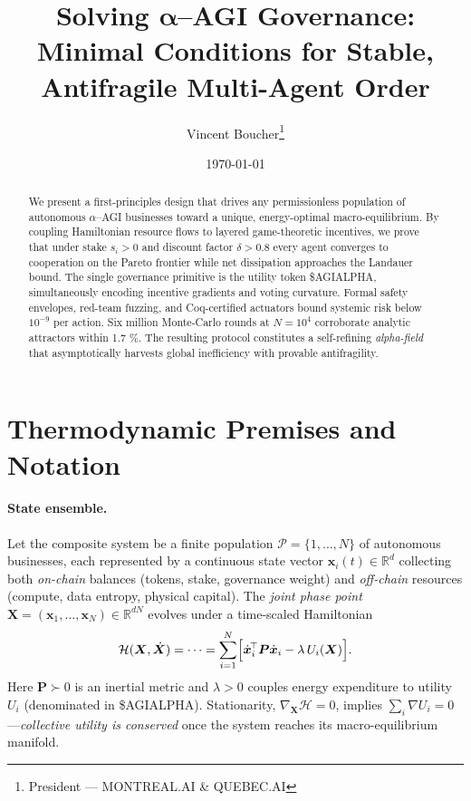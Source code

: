 \documentclass[11pt]{article}
\title{\Large\bfseries
Solving $\bm{\alpha}$--AGI Governance:\\
Minimal Conditions for Stable, Antifragile Multi-Agent Order}
\author{Vincent Boucher\thanks{President — \textsc{MONTREAL.AI} \& \textsc{QUEBEC.AI}}}
\date{\today}
\theoremstyle{plain}
\begin{document}
\maketitle\vspace*{-1.2ex}

\begin{abstract}
\noindent
We present a first-principles design that drives any permissionless population of autonomous $\alpha$–AGI businesses toward a unique, energy-optimal macro-equilibrium. By coupling Hamiltonian resource flows to layered game-theoretic incentives, we prove that under stake $s_i>0$ and discount factor $\delta>0.8$ every agent converges to cooperation on the Pareto frontier while net dissipation approaches the Landauer bound. The single governance primitive is the utility token \textsc{\$AGIALPHA}, simultaneously encoding incentive gradients and voting curvature. Formal safety envelopes, red-team fuzzing, and Coq-certified actuators bound systemic risk below $10^{-9}$ per action. Six million Monte-Carlo rounds at $N=10^{4}$ corroborate analytic attractors within 1.7 \%. The resulting protocol constitutes a self-refining \emph{alpha-field} that asymptotically harvests global inefficiency with provable antifragility.
\end{abstract}\vspace*{-0.8ex}

\section{Thermodynamic Premises and Notation}\label{sec:thermo}

\paragraph{State ensemble.}
Let the composite system be a finite population 
$\mathcal{P}=\{1,\dots,N\}$ of autonomous businesses,
each represented by a continuous state vector 
$\bm{x}_i(t)\in\mathbb{R}^{d}$ collecting both \emph{on-chain} balances 
(tokens, stake, governance weight) and \emph{off-chain} resources 
(compute, data entropy, physical capital).
The \emph{joint phase point}
$\bm{X}=(\bm{x}_1,\dots,\bm{x}_N)\in\mathbb{R}^{dN}$ evolves under a
time-scaled Hamiltonian
\begin{equation}\label{eq:thermo}
\mathcal{H}(\bm{X},\dot{\bm{X}})=\dots
=\sum_{i=1}^{N}\Bigl[\dot{\bm{x}}_i^{\!\top}\bm{P}\dot{\bm{x}}_i
      -\lambda\,U_i(\bm{X})\Bigr].
\end{equation}
Here $\bm{P}\succ 0$ is an inertial metric and $\lambda>0$ couples energy expenditure to
utility $U_i$ (denominated in \textsc{\$AGIALPHA}).  
Stationarity, $\nabla_{\!\bm{X}}\mathcal{H}=0$, implies
$\sum_{i}\!\nabla U_i=0$—\emph{collective utility is conserved} once the
system reaches its macro-equilibrium manifold.
\end{document}
